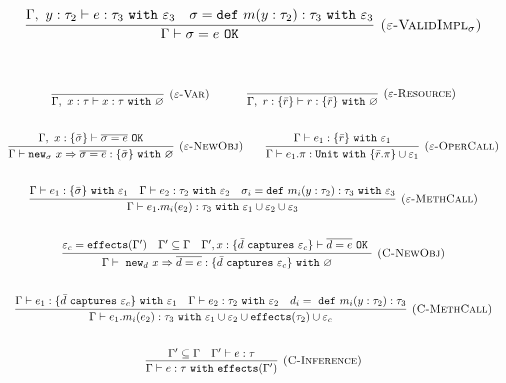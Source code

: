 \documentclass{llncs}
\newcommand{\keywadj}[1]{\mathtt{#1}}
\newcommand{\keyw}[1]{\keywadj{#1}~}
\newcommand{\type}[2]{
	#1~\keyw{with} #2
}
\newcommand{\newsig}[0]{
	\keywadj{new}_\sigma~x \Rightarrow \overline{\sigma = e}
}
\begin{document}
\[
\begin{array}{c}
\infer[\textsc{($\varepsilon$-ValidImpl$_\sigma$)}]
	{\Gamma \vdash \sigma = e~\keywadj{OK}}
	{\Gamma,~y:\tau_2 \vdash e: \tau_3~\keyw{with} \varepsilon_3 & \sigma = \keyw{def} m(y:\tau_2):\tau_3~\keyw{with} \varepsilon_3} \\[5ex]
\end{array}
\]


\noindent
\fbox{$\Gamma \vdash e : \tau~\keyw{with} \varepsilon$}

\[
\begin{array}{c}
	\infer[\textsc{($\varepsilon$-Var)}]
  {\Gamma,~x:\tau \vdash x: \type{\tau}{\varnothing} }
  {} 
~~~~~~~~~~
\infer[\textsc{($\varepsilon$-Resource)}]
  {\Gamma,~r :\{\bar r\} \vdash r: \type{   \{ \bar r \}  }{\varnothing}}
  {} \\[5ex]

\infer[\textsc{($\varepsilon$-NewObj)}]
	{\Gamma \vdash \newsig : \{ \bar \sigma \}~\keyw{with} \varnothing}
	{\Gamma,~x : \{ \bar \sigma \} \vdash \overline{\sigma = e}~\keywadj{OK}} ~~~~~~

\infer[\textsc{($\varepsilon$-OperCall)}]
	{\Gamma \vdash e_1.\pi : \keyw{Unit} \keyw{with} \{ \bar r.\pi \} \cup \varepsilon_1}
	{\Gamma \vdash e_1 : \{ \bar r \}~ \keyw{with} \varepsilon_1} \\[5ex]
	
\infer[\textsc{($\varepsilon$-MethCall)}]
	{\Gamma \vdash e_1.m_i(e_2):\tau_3~\keyw{with} \varepsilon_1 \cup \varepsilon_2 \cup \varepsilon_3}
	{\Gamma \vdash e_1 : \{ \bar \sigma \}~\keyw{with} \varepsilon_1 & \Gamma \vdash e_2 : \tau_2~\keyw{with} \varepsilon_2 & \sigma_i = \keyw{def} m_i(y:\tau_2):\tau_3~\keyw{with} \varepsilon_3} \\[5ex]
	
\infer[\textsc{(C-NewObj)}]
	{\Gamma \vdash~\keywadj{new}_d~x \Rightarrow \overline{d = e} : \{  \bar d~\keyw{captures} \varepsilon_c \} ~\keyw{with} \varnothing }
	{\varepsilon_c = \keywadj{effects}(\Gamma') & \Gamma' \subseteq \Gamma & \Gamma', x : \{ \bar d~\keyw {captures} \varepsilon_c \} \vdash \overline{d = e}~\keyw{OK}} \\[5ex]
	
\infer[\textsc{(C-MethCall)}]
	{\Gamma \vdash e_1.m_i(e_2) : \tau_3~ \keyw{with} \varepsilon_1 \cup \varepsilon_2 \cup \keywadj{effects}(\tau_2) \cup \varepsilon_c}
	{\Gamma \vdash e_1 : \{ \bar d~\keyw{captures} \varepsilon_c \}~\keyw{with} \varepsilon_1 & \Gamma \vdash e_2:\tau_2~\keyw{with} \varepsilon_2&d_i =~\keyw{def} m_i(y:\tau_2):\tau_3 } \\[5ex]

\infer[\textsc{(C-Inference)}]
	{\Gamma \vdash e : \tau ~\keyw{with} \keywadj{effects}(\Gamma') }
	{\Gamma' \subseteq \Gamma & \Gamma' \vdash e : \tau } \\[5ex]
\end{array}
\]
\end{document}
